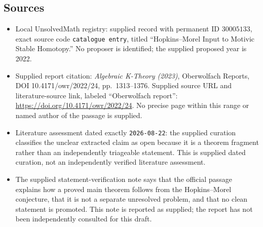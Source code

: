 \documentclass[11pt]{article}
\begin{document}
\subsection{Sources}
\begin{itemize}
\item Local UnsolvedMath registry: supplied record with permanent ID \(30005133\), exact source code \texttt{catalogue entry}, titled ``Hopkins--Morel Input to Motivic Stable Homotopy.'' No proposer is identified; the supplied proposed year is 2022.
\item Supplied report citation: \emph{Algebraic K-Theory (2023)}, Oberwolfach Reports, DOI 10.4171/owr/2022/24, pp.~1313--1376. Supplied source URL and literature-source link, labeled ``Oberwolfach report'': \url{https://doi.org/10.4171/owr/2022/24}. No precise page within this range or named author of the passage is supplied.
\item Literature assessment dated exactly \texttt{2026-08-22}: the supplied curation classifies the unclear extracted claim as open because it is a theorem fragment rather than an independently triageable statement. This is supplied dated curation, not an independently verified literature assessment.
\item The supplied statement-verification note says that the official passage explains how a proved main theorem follows from the Hopkins--Morel conjecture, that it is not a separate unresolved problem, and that no clean statement is promoted. This note is reported as supplied; the report has not been independently consulted for this draft.
\end{itemize}
\end{document}

